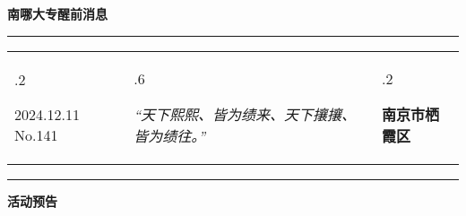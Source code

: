 \documentclass[letterpaper, 12pt]{article}
\begin{document}
\begin{center}
    \Huge\textbf{南哪大专醒前消息}
\end{center}
\vspace{4mm}
\hrule
\renewcommand\tabularxcolumn[1]{m{#1}}
\begin{tabularx}{\textwidth}{>{\hsize.2\hsize}X>{\hsize.6\hsize}X>{\hsize.2\hsize}X}
    \begin{flushleft}
        2024.12.11\, No.141
    \end{flushleft}
    &
    \begin{center}
        \textit{“天下熙熙、皆为绩来、天下攘攘、皆为绩往。”}
    \end{center}
    &
    \begin{flushright}
        \textbf{南京市栖霞区}
    \end{flushright}
\end{tabularx}
\vspace{-3.5mm}
\hrule
\vspace{4mm}
\centerline{\huge\textbf{活动预告}}
\end{document}
